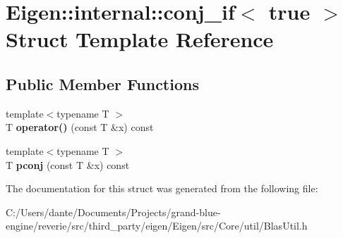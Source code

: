 \hypertarget{struct_eigen_1_1internal_1_1conj__if_3_01true_01_4}{}\section{Eigen\+::internal\+::conj\+\_\+if$<$ true $>$ Struct Template Reference}
\label{struct_eigen_1_1internal_1_1conj__if_3_01true_01_4}
\subsection*{Public Member Functions}
\begin{DoxyCompactItemize}
\item 
\mbox{\label{struct_eigen_1_1internal_1_1conj__if_3_01true_01_4_ac702d64c1cc0b8a4b2eebeafd57c473f}} 
{\footnotesize template$<$typename T $>$ }\\T {\bfseries operator()} (const T \&x) const
\item 
\mbox{\label{struct_eigen_1_1internal_1_1conj__if_3_01true_01_4_a4dd4359e90b3e47f301e3cc517548ed5}} 
{\footnotesize template$<$typename T $>$ }\\T {\bfseries pconj} (const T \&x) const
\end{DoxyCompactItemize}


The documentation for this struct was generated from the following file\+:\begin{DoxyCompactItemize}
\item 
C\+:/\+Users/dante/\+Documents/\+Projects/grand-\/blue-\/engine/reverie/src/third\+\_\+party/eigen/\+Eigen/src/\+Core/util/Blas\+Util.\+h\end{DoxyCompactItemize}
